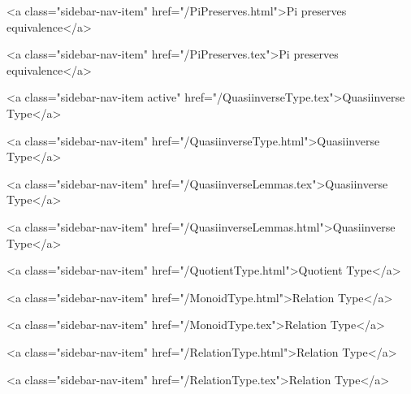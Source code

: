       
        
          <a class="sidebar-nav-item" href="/PiPreserves.html">Pi preserves equivalence</a>
        
      
    
      
        
          <a class="sidebar-nav-item" href="/PiPreserves.tex">Pi preserves equivalence</a>
        
      
    
      
        
          <a class="sidebar-nav-item active" href="/QuasiinverseType.tex">Quasiinverse Type</a>
        
      
    
      
        
          <a class="sidebar-nav-item" href="/QuasiinverseType.html">Quasiinverse Type</a>
        
      
    
      
        
          <a class="sidebar-nav-item" href="/QuasiinverseLemmas.tex">Quasiinverse Type</a>
        
      
    
      
        
          <a class="sidebar-nav-item" href="/QuasiinverseLemmas.html">Quasiinverse Type</a>
        
      
    
      
        
          <a class="sidebar-nav-item" href="/QuotientType.html">Quotient Type</a>
        
      
    
      
        
          <a class="sidebar-nav-item" href="/MonoidType.html">Relation Type</a>
        
      
    
      
        
          <a class="sidebar-nav-item" href="/MonoidType.tex">Relation Type</a>
        
      
    
      
        
          <a class="sidebar-nav-item" href="/RelationType.html">Relation Type</a>
        
      
    
      
        
          <a class="sidebar-nav-item" href="/RelationType.tex">Relation Type</a>
        
